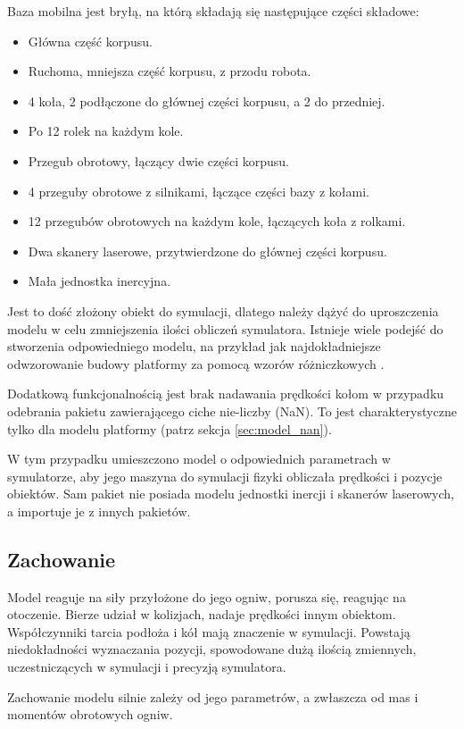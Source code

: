 	Baza mobilna jest bryłą, na którą składają się następujące części składowe:
	\begin{itemize}
	\item Główna część korpusu.
	\item Ruchoma, mniejsza część korpusu, z przodu robota.
	\item 4 koła, 2 podłączone do głównej części korpusu, a 2 do przedniej.
	\item Po 12 rolek na każdym kole.
	\item Przegub obrotowy, łączący dwie części korpusu.
	\item 4 przeguby obrotowe z silnikami, łączące części bazy z kołami.
	\item 12 przegubów obrotowych na każdym kole, łączących koła z rolkami.
	\item Dwa skanery laserowe, przytwierdzone do głównej części korpusu.
	\item Mała jednostka inercyjna.
	\end{itemize}

	Jest to dość złożony obiekt do symulacji, dlatego należy dążyć do uproszczenia modelu w celu zmniejszenia ilości obliczeń symulatora.
	Istnieje wiele podejść do stworzenia odpowiedniego modelu, na przykład jak najdokładniejsze odwzorowanie budowy platformy 
	za pomocą wzorów różniczkowych \cite{braking} \cite{modelling_ways}.
	
	Dodatkową funkcjonalnością jest brak nadawania prędkości kołom w przypadku odebrania pakietu zawierającego ciche nie-liczby (NaN).
	To jest charakterystyczne tylko dla modelu platformy (patrz sekcja \ref{sec:model_nan}).
	
	W tym przypadku umieszczono model o odpowiednich parametrach w symulatorze, aby jego maszyna do symulacji fizyki obliczała prędkości i pozycje obiektów.
	Sam pakiet nie posiada modelu jednostki inercji i skanerów laserowych, a importuje je z innych pakietów.
	
	\subsection{Zachowanie}
		Model reaguje na siły przyłożone do jego ogniw, porusza się, reagując na otoczenie.
		Bierze udział w kolizjach, nadaje prędkości innym obiektom.
		Współczynniki tarcia podłoża i kół mają znaczenie w symulacji.
		Powstają niedokładności wyznaczania pozycji, spowodowane dużą ilością zmiennych, uczestniczących w symulacji i precyzją symulatora.
		
		Zachowanie modelu silnie zależy od jego parametrów, a zwłaszcza od mas i momentów obrotowych ogniw.
	
